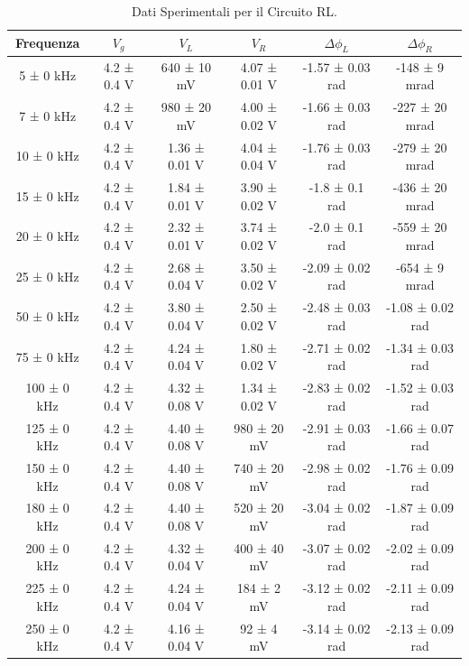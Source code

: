 \documentclass[a4paper]{article}
\begin{document}
\begin{table}[htbp]
    \centering
    \begin{tabular}{|c|c|c|c|c|c|}
    \hline
    Frequenza & $V_g$ & $V_L$ & $V_R$ & $\Delta\phi_L$ & $\Delta\phi_R$ \\\hline\hline
    5 ± 0 kHz & 4.2 ± 0.4 V & 640 ± 10 mV & 4.07 ± 0.01 V & -1.57 ± 0.03 rad & -148 ± 9 mrad \\
    7 ± 0 kHz & 4.2 ± 0.4 V & 980 ± 20 mV & 4.00 ± 0.02 V & -1.66 ± 0.03 rad & -227 ± 20 mrad \\
    10 ± 0 kHz & 4.2 ± 0.4 V & 1.36 ± 0.01 V & 4.04 ± 0.04 V & -1.76 ± 0.03 rad & -279 ± 20 mrad \\
    15 ± 0 kHz & 4.2 ± 0.4 V & 1.84 ± 0.01 V & 3.90 ± 0.02 V & -1.8 ± 0.1 rad & -436 ± 20 mrad \\
    20 ± 0 kHz & 4.2 ± 0.4 V & 2.32 ± 0.01 V & 3.74 ± 0.02 V & -2.0 ± 0.1 rad & -559 ± 20 mrad \\
    25 ± 0 kHz & 4.2 ± 0.4 V & 2.68 ± 0.04 V & 3.50 ± 0.02 V & -2.09 ± 0.02 rad & -654 ± 9 mrad \\
    50 ± 0 kHz & 4.2 ± 0.4 V & 3.80 ± 0.04 V & 2.50 ± 0.02 V & -2.48 ± 0.03 rad & -1.08 ± 0.02 rad \\
    75 ± 0 kHz & 4.2 ± 0.4 V & 4.24 ± 0.04 V & 1.80 ± 0.02 V & -2.71 ± 0.02 rad & -1.34 ± 0.03 rad \\
    100 ± 0 kHz & 4.2 ± 0.4 V & 4.32 ± 0.08 V & 1.34 ± 0.02 V & -2.83 ± 0.02 rad & -1.52 ± 0.03 rad \\
    125 ± 0 kHz & 4.2 ± 0.4 V & 4.40 ± 0.08 V & 980 ± 20 mV & -2.91 ± 0.03 rad & -1.66 ± 0.07 rad \\
    150 ± 0 kHz & 4.2 ± 0.4 V & 4.40 ± 0.08 V & 740 ± 20 mV & -2.98 ± 0.02 rad & -1.76 ± 0.09 rad \\
    180 ± 0 kHz & 4.2 ± 0.4 V & 4.40 ± 0.08 V & 520 ± 20 mV & -3.04 ± 0.02 rad & -1.87 ± 0.09 rad \\
    200 ± 0 kHz & 4.2 ± 0.4 V & 4.32 ± 0.04 V & 400 ± 40 mV & -3.07 ± 0.02 rad & -2.02 ± 0.09 rad \\
    225 ± 0 kHz & 4.2 ± 0.4 V & 4.24 ± 0.04 V & 184 ± 2 mV & -3.12 ± 0.02 rad & -2.11 ± 0.09 rad \\
    250 ± 0 kHz & 4.2 ± 0.4 V & 4.16 ± 0.04 V & 92 ± 4 mV & -3.14 ± 0.02 rad & -2.13 ± 0.09 rad \\
    \hline
    \end{tabular}
    \caption{Dati Sperimentali per il Circuito RL.}
    \label{tab:dati_sperimentali_rl}
    \end{table}
\end{document}
